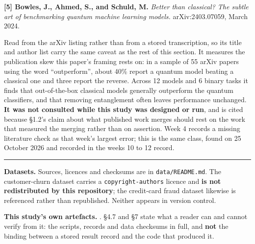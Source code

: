 \documentclass[
  10pt,
]{article}
\begin{document}
\textbf{{[}5{]} Bowles, J., Ahmed, S., and Schuld, M.} \emph{Better than
classical? The subtle art of benchmarking quantum machine learning
models.} arXiv:2403.07059, March 2024.

Read from the arXiv listing rather than from a stored transcription, so
its title and author list carry the same caveat as the rest of this
section. It measures the publication skew this paper's framing rests on:
in a sample of 55 arXiv papers using the word ``outperform'', about 40\%
report a quantum model beating a classical one and three report the
reverse. Across 12 models and 6 binary tasks it finds that
out-of-the-box classical models generally outperform the quantum
classifiers, and that removing entanglement often leaves performance
unchanged. \textbf{It was not consulted while this study was designed or
run}, and is cited because \S{}1.2's claim about what published work
merges should rest on the work that measured the merging rather than on
assertion. Week 4 records a missing literature check as that week's
largest error; this is the same class, found on 25 October 2026 and
recorded in the weeks 10 to 12 record.

\begin{center}\rule{0.5\linewidth}{0.5pt}\end{center}

\textbf{Datasets.} Sources, licences and checksums are in
\texttt{data/\allowbreak{}README.md}. The customer-churn dataset carries a
\texttt{copyright-authors} licence and \textbf{is not redistributed by
this repository}; the credit-card fraud dataset likewise is referenced
rather than republished. Neither appears in version control.

\textbf{This study's own artefacts.}
\texttt{}. \S{}4.7 and
\S{}7 state what a reader can and cannot verify from it: the scripts,
records and data checksums in full, and \textbf{not} the binding between
a stored result record and the code that produced it.
\end{document}
